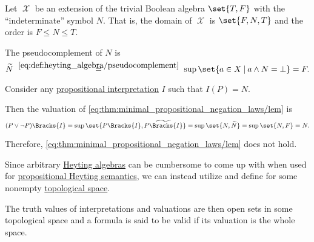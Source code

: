 \begin{example}\label{ex:heyting_semantics_lem_counterexample}
  Let \( \mscrX \) be an extension of the trivial Boolean algebra \( \set{ T, F } \) with the \enquote{indeterminate} symbol \( N \). That is, the domain of \( \mscrX \) is \( \set{ F, N, T } \) and the order is \( F \leq N \leq T \).

  The pseudocomplement of \( N \) is
  \begin{equation*}
    \widetilde{N}
    \reloset {\eqref{eq:def:heyting_algebra/pseudocomplement}} =
    \sup\set{ a \in X \given a \wedge N = \bot }
    =
    F.
  \end{equation*}

  Consider any \hyperref[def:propositional_valuation]{propositional interpretation} \( I \) such that \( I(P) = N \).

  Then the valuation of \eqref{eq:thm:minimal_propositional_negation_laws/lem} is
  \begin{equation*}
    (P \vee \neg P)\Bracks{I}
    =
    \sup\set{ P\Bracks{I}, \widetilde{P\Bracks{I}} }
    =
    \sup\set{ N, \widetilde{N} }
    =
    \sup\set{ N, F }
    =
    N.
  \end{equation*}

  Therefore, \eqref{eq:thm:minimal_propositional_negation_laws/lem} does not hold.
\end{example}

\begin{definition}\label{def:propositional_topological_semantics}
  Since arbitrary \hyperref[def:heyting_algebra]{Heyting algebras} can be cumbersome to come up with when used for \hyperref[def:propositional_heyting_algebra_semantics]{propositional Heyting semantics}, we can instead utilize  and define  for some nonempty \hyperref[def:topological_space]{topological space}.

  The truth values of interpretations and valuations are then open sets in some topological space and a formula is said to be valid if its valuation is the whole space.
\end{definition}

